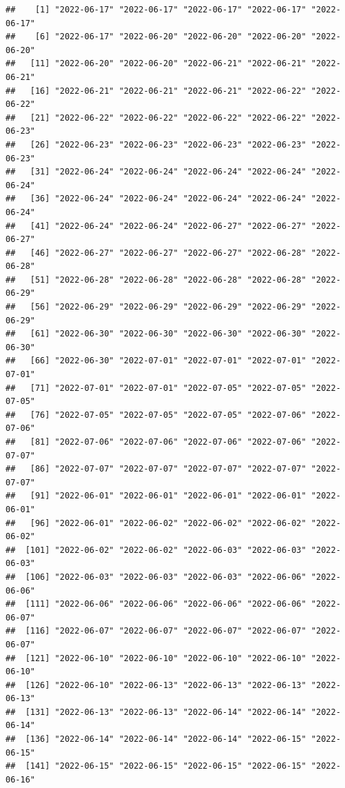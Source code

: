 \documentclass[
]{article}
\newenvironment{Shaded}{\begin{snugshade}}{\end{snugshade}}
\newcommand{\FunctionTok}[1]{\textcolor[rgb]{0.00,0.00,0.00}{#1}}
\newcommand{\NormalTok}[1]{#1}
\newcommand{\SpecialCharTok}[1]{\textcolor[rgb]{0.00,0.00,0.00}{#1}}
\begin{document}
\begin{Shaded}
\end{Shaded}

\begin{verbatim}
##    [1] "2022-06-17" "2022-06-17" "2022-06-17" "2022-06-17" "2022-06-17"
##    [6] "2022-06-17" "2022-06-20" "2022-06-20" "2022-06-20" "2022-06-20"
##   [11] "2022-06-20" "2022-06-20" "2022-06-21" "2022-06-21" "2022-06-21"
##   [16] "2022-06-21" "2022-06-21" "2022-06-21" "2022-06-22" "2022-06-22"
##   [21] "2022-06-22" "2022-06-22" "2022-06-22" "2022-06-22" "2022-06-23"
##   [26] "2022-06-23" "2022-06-23" "2022-06-23" "2022-06-23" "2022-06-23"
##   [31] "2022-06-24" "2022-06-24" "2022-06-24" "2022-06-24" "2022-06-24"
##   [36] "2022-06-24" "2022-06-24" "2022-06-24" "2022-06-24" "2022-06-24"
##   [41] "2022-06-24" "2022-06-24" "2022-06-27" "2022-06-27" "2022-06-27"
##   [46] "2022-06-27" "2022-06-27" "2022-06-27" "2022-06-28" "2022-06-28"
##   [51] "2022-06-28" "2022-06-28" "2022-06-28" "2022-06-28" "2022-06-29"
##   [56] "2022-06-29" "2022-06-29" "2022-06-29" "2022-06-29" "2022-06-29"
##   [61] "2022-06-30" "2022-06-30" "2022-06-30" "2022-06-30" "2022-06-30"
##   [66] "2022-06-30" "2022-07-01" "2022-07-01" "2022-07-01" "2022-07-01"
##   [71] "2022-07-01" "2022-07-01" "2022-07-05" "2022-07-05" "2022-07-05"
##   [76] "2022-07-05" "2022-07-05" "2022-07-05" "2022-07-06" "2022-07-06"
##   [81] "2022-07-06" "2022-07-06" "2022-07-06" "2022-07-06" "2022-07-07"
##   [86] "2022-07-07" "2022-07-07" "2022-07-07" "2022-07-07" "2022-07-07"
##   [91] "2022-06-01" "2022-06-01" "2022-06-01" "2022-06-01" "2022-06-01"
##   [96] "2022-06-01" "2022-06-02" "2022-06-02" "2022-06-02" "2022-06-02"
##  [101] "2022-06-02" "2022-06-02" "2022-06-03" "2022-06-03" "2022-06-03"
##  [106] "2022-06-03" "2022-06-03" "2022-06-03" "2022-06-06" "2022-06-06"
##  [111] "2022-06-06" "2022-06-06" "2022-06-06" "2022-06-06" "2022-06-07"
##  [116] "2022-06-07" "2022-06-07" "2022-06-07" "2022-06-07" "2022-06-07"
##  [121] "2022-06-10" "2022-06-10" "2022-06-10" "2022-06-10" "2022-06-10"
##  [126] "2022-06-10" "2022-06-13" "2022-06-13" "2022-06-13" "2022-06-13"
##  [131] "2022-06-13" "2022-06-13" "2022-06-14" "2022-06-14" "2022-06-14"
##  [136] "2022-06-14" "2022-06-14" "2022-06-14" "2022-06-15" "2022-06-15"
##  [141] "2022-06-15" "2022-06-15" "2022-06-15" "2022-06-15" "2022-06-16"

\end{verbatim}
\end{document}
